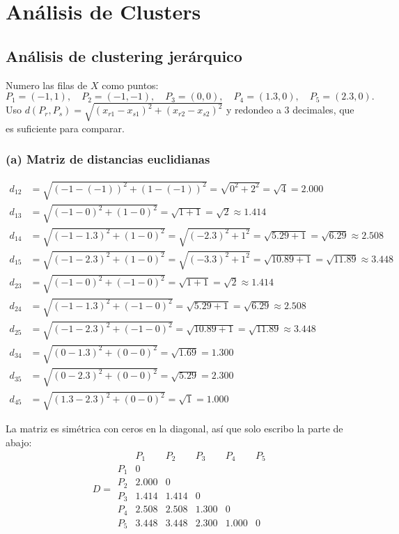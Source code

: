 \documentclass[11pt]{article}\usepackage[]{graphicx}\usepackage[]{xcolor}
\begin{document}
\section{Análisis de Clusters}
\subsection{Análisis de clustering jerárquico}

Numero las filas de $X$ como puntos:
\[
P_1 = (-1,1),\quad P_2 = (-1,-1),\quad P_3 = (0,0),\quad P_4 = (1.3,0),\quad P_5 = (2.3,0).
\]
Uso $d(P_r,P_s) = \sqrt{(x_{r1}-x_{s1})^2 + (x_{r2}-x_{s2})^2}$ y redondeo a 3 decimales, que es suficiente para comparar.

\subsubsection*{(a) Matriz de distancias euclidianas}

\begin{align*}
d_{12} &= \sqrt{(-1-(-1))^2 + (1-(-1))^2} = \sqrt{0^2 + 2^2} = \sqrt{4} = 2.000\\
d_{13} &= \sqrt{(-1-0)^2 + (1-0)^2} = \sqrt{1 + 1} = \sqrt{2} \approx 1.414\\
d_{14} &= \sqrt{(-1-1.3)^2 + (1-0)^2} = \sqrt{(-2.3)^2 + 1^2} = \sqrt{5.29 + 1} = \sqrt{6.29} \approx 2.508\\
d_{15} &= \sqrt{(-1-2.3)^2 + (1-0)^2} = \sqrt{(-3.3)^2 + 1^2} = \sqrt{10.89 + 1} = \sqrt{11.89} \approx 3.448\\
d_{23} &= \sqrt{(-1-0)^2 + (-1-0)^2} = \sqrt{1 + 1} = \sqrt{2} \approx 1.414\\
d_{24} &= \sqrt{(-1-1.3)^2 + (-1-0)^2} = \sqrt{5.29 + 1} = \sqrt{6.29} \approx 2.508\\
d_{25} &= \sqrt{(-1-2.3)^2 + (-1-0)^2} = \sqrt{10.89 + 1} = \sqrt{11.89} \approx 3.448\\
d_{34} &= \sqrt{(0-1.3)^2 + (0-0)^2} = \sqrt{1.69} = 1.300\\
d_{35} &= \sqrt{(0-2.3)^2 + (0-0)^2} = \sqrt{5.29} = 2.300\\
d_{45} &= \sqrt{(1.3-2.3)^2 + (0-0)^2} = \sqrt{1} = 1.000
\end{align*}

La matriz es simétrica con ceros en la diagonal, así que solo escribo la parte de abajo:
\[
D = \begin{array}{c|ccccc}
 & P_1 & P_2 & P_3 & P_4 & P_5\\ \hline
P_1 & 0 & & & & \\
P_2 & 2.000 & 0 & & & \\
P_3 & 1.414 & 1.414 & 0 & & \\
P_4 & 2.508 & 2.508 & 1.300 & 0 & \\
P_5 & 3.448 & 3.448 & 2.300 & 1.000 & 0
\end{array}
\]
\end{document}
